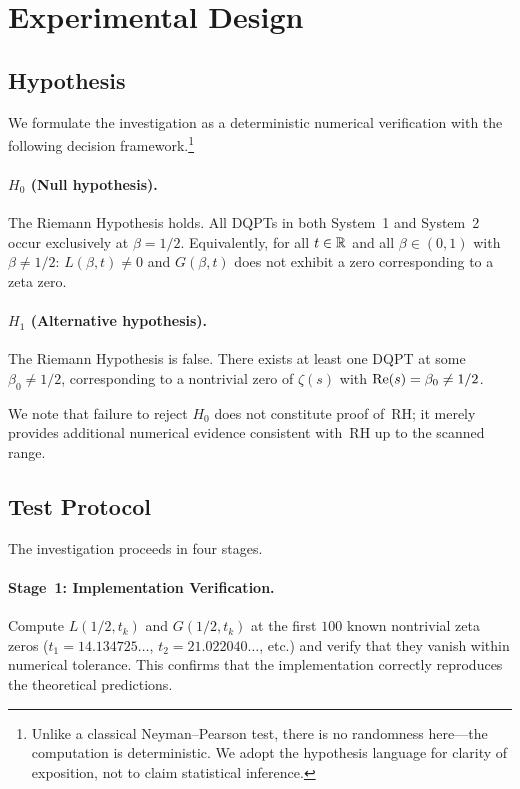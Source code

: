 \section{Experimental Design}
\label{sec:experiment}

\subsection{Hypothesis}
\label{sec:hypothesis}

We formulate the investigation as a deterministic numerical verification with the
following decision framework.\footnote{Unlike a classical Neyman--Pearson test, there is
no randomness here---the computation is deterministic. We adopt the hypothesis language
for clarity of exposition, not to claim statistical inference.}

\paragraph{$H_0$ (Null hypothesis).}
The Riemann Hypothesis holds. All DQPTs in both System~1 and System~2 occur exclusively
at $\beta = 1/2$. Equivalently, for all $t \in \mathbb{R}$ and all $\beta \in (0,1)$ with
$\beta \neq 1/2$: $L(\beta, t) \neq 0$ and $G(\beta, t)$ does not exhibit a zero
corresponding to a zeta zero.

\paragraph{$H_1$ (Alternative hypothesis).}
The Riemann Hypothesis is false. There exists at least one DQPT at some
$\beta_0 \neq 1/2$, corresponding to a nontrivial zero of $\zeta(s)$ with
$\operatorname{Re}(s) = \beta_0 \neq 1/2$.

We note that failure to reject $H_0$ does not constitute proof of~RH; it merely provides
additional numerical evidence consistent with~RH up to the scanned range.


\subsection{Test Protocol}
\label{sec:protocol}

The investigation proceeds in four stages.

\paragraph{Stage~1: Implementation Verification.}
Compute $L(1/2, t_k)$ and $G(1/2, t_k)$ at the first $100$ known nontrivial zeta zeros
($t_1 = 14.134725\ldots$, $t_2 = 21.022040\ldots$, etc.) and verify that they vanish
within numerical tolerance. This confirms that the implementation correctly reproduces
the theoretical predictions.

